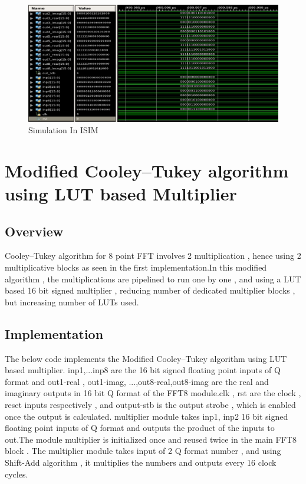 \documentclass{article}
\begin{document}
\begin{figure}[h!]
  \caption{Simulation In ISIM}
  \includegraphics[width=1.0\columnwidth]{simulation_images/figure_2.jpg} 
\end{figure}


\section{Modified Cooley–Tukey algorithm using LUT based Multiplier}

\subsection{Overview}
Cooley–Tukey algorithm for 8 point FFT involves 2 multiplication , hence using 2 multiplicative blocks as seen in the first implementation.In this modified algorithm , the multiplications are pipelined to run one by one , and using a LUT based 16 bit signed multiplier , reducing number of dedicated multiplier blocks , but increasing number of LUTs used.

\subsection{Implementation}

The below code implements the Modified Cooley–Tukey algorithm using LUT based multiplier. inp1,...inp8 are the 16 bit signed floating point inputs of Q format and out1-real , out1-imag, ...,out8-real,out8-imag are the real and imaginary outputs in 16 bit Q format of the FFT8 module.clk , rst are the clock , reset inputs respectively , and output-stb is the output strobe , which is enabled once the output is calculated.
multiplier module takes inp1, inp2 16 bit signed floating point inputs of Q format and outputs the product of the inputs to out.The module multiplier is initialized once and reused twice in the main FFT8 block .
The multiplier module takes input of 2 Q format number , and using Shift-Add algorithm , it multiplies the numbers and outputs every 16 clock cycles.
\end{document}

